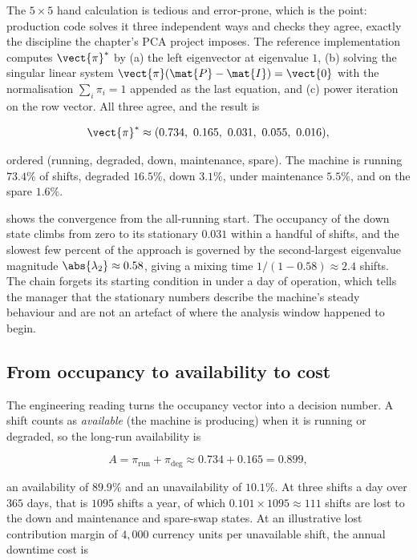 The $5 \times 5$ hand calculation is tedious and error-prone, which is
the point: production code solves it three independent ways and checks
they agree, exactly the discipline the chapter's PCA project imposes.
The reference implementation 
computes $\vect{\pi}^{*}$ by (a) the left eigenvector at eigenvalue
$1$, (b) solving the singular linear system $\vect{\pi}(\mat{P} -
\mat{I}) = \vect{0}$ with the normalisation $\sum_{i}\pi_{i} = 1$
appended as the last equation, and (c) power iteration on the row
vector. All three agree, and the result is

\[
\vect{\pi}^{*} \approx (0.734,\ 0.165,\ 0.031,\ 0.055,\ 0.016),
\]

ordered (running, degraded, down, maintenance, spare). The machine is
running $73.4\%$ of shifts, degraded $16.5\%$, down $3.1\%$, under
maintenance $5.5\%$, and on the spare $1.6\%$.



 shows the convergence from
the all-running start. The occupancy of the down state climbs from
zero to its stationary $0.031$ within a handful of shifts, and the
slowest few percent of the approach is governed by the second-largest
eigenvalue magnitude $\abs{\lambda_{2}} \approx 0.58$, giving a mixing
time $1/(1 - 0.58) \approx 2.4$ shifts. The chain forgets its starting
condition in under a day of operation, which tells the manager that the
stationary numbers describe the machine's steady behaviour and are not
an artefact of where the analysis window happened to begin.

\subsection{From occupancy to availability to cost}

The engineering reading turns the occupancy vector into a decision
number. A shift counts as \emph{available} (the machine is producing)
when it is running or degraded, so the long-run availability is

\[
A = \pi_{\text{run}} + \pi_{\text{deg}} \approx 0.734 + 0.165 = 0.899,
\]

an availability of $89.9\%$ and an unavailability of $10.1\%$. At three
shifts a day over $365$ days, that is $1095$ shifts a year, of which
$0.101 \times 1095 \approx 111$ shifts are lost to the down and
maintenance and spare-swap states. At an illustrative lost
contribution margin of $4{,}000$ currency units per unavailable shift,
the annual downtime cost is

